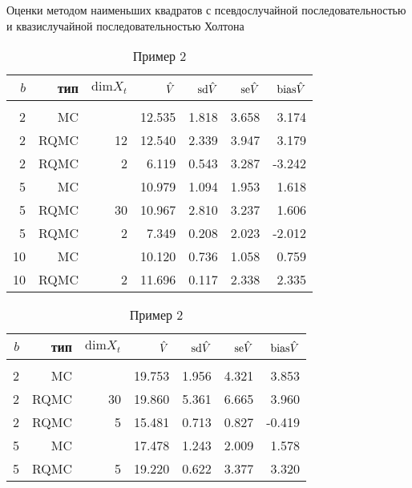 \begin{table}
    \renewcommand{\arraystretch}{0.6}
    \centering
    Оценки методом наименьших квадратов с псевдослучайной последовательностью и квазислучайной последовательностью Холтона
    \caption{Пример 1}\label{tbl:lsm_halton_ex1}
    \begin{tabular}{rrrrrrr}
        $b$&тип&$\mathrm{dim} X_t$&$\hat{V}$&$\mathrm{sd}\hat{V}$&$\mathrm{se}\hat{V}$&$\mathrm{bias}\hat{V}$\\[3pt]\hline\\[-8pt]
        2&MC&&12.535&1.818&3.658&3.174\\
        2&RQMC&12&12.540&2.339&3.947&3.179\\
        2&RQMC&2&6.119&0.543&3.287&-3.242\\[3pt]
        5&MC&&10.979&1.094&1.953&1.618\\
        5&RQMC&30&10.967&2.810&3.237&1.606\\
        5&RQMC&2&7.349&0.208&2.023&-2.012\\[3pt]
        10&MC&&10.120&0.736&1.058&0.759\\
        10&RQMC&2&11.696&0.117&2.338&2.335\\[3pt]
    \end{tabular}

    \caption{Пример 2}\label{tbl:lsm_halton_ex2}
    \begin{tabular}{rrrrrrr}
        $b$&тип&$\mathrm{dim} X_t$&$\hat{V}$&$\mathrm{sd}\hat{V}$&$\mathrm{se}\hat{V}$&$\mathrm{bias}\hat{V}$\\[3pt]\hline\\[-8pt]
        2&MC&&19.753&1.956&4.321&3.853\\
        2&RQMC&30&19.860&5.361&6.665&3.960\\
        2&RQMC&5&15.481&0.713&0.827&-0.419\\[3pt]
        5&MC&&17.478&1.243&2.009&1.578\\
        5&RQMC&5&19.220&0.622&3.377&3.320\\[3pt]
    \end{tabular}


\end{table}

